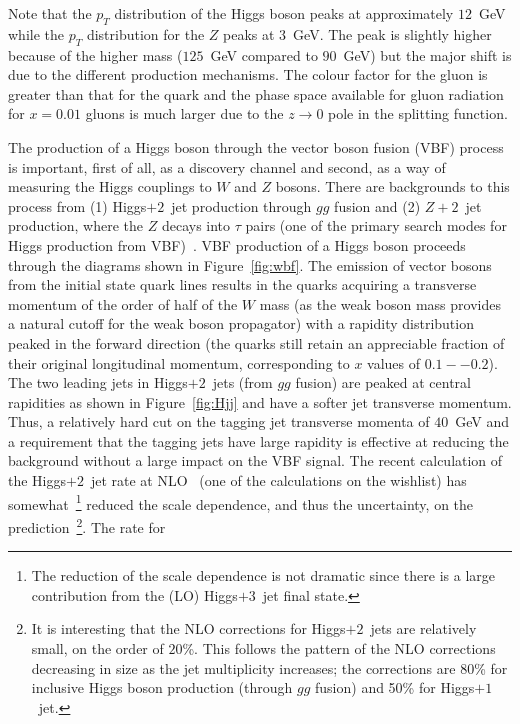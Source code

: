 \documentclass[12pt]{iopart}
\begin{document}
Note that the $p_T$ distribution of the Higgs boson peaks at approximately $12$~GeV while the $p_T$ distribution for the $Z$ peaks
at $3$~GeV. The peak is slightly higher because of the higher mass ($125$~GeV compared to $90$~GeV) but the major shift is
due to the different production mechanisms. The colour factor for the gluon is greater than that for the quark and the
phase space available for gluon radiation for $x=0.01$ gluons is much larger due to the $z \rightarrow 0$ pole in
the splitting function. 

The production of a Higgs boson through the vector boson fusion (VBF) process is important, first of all, as a discovery
channel and second, as a way of measuring the Higgs couplings to $W$ and $Z$ bosons. There are backgrounds to this process
from (1) Higgs$ + 2$~jet production through $gg$ fusion and (2) $Z + 2$~jet production, where the $Z$ decays into $\tau$
pairs (one of the primary  search modes for Higgs production from VBF)~\cite{Berger:2004pc}. VBF production of a Higgs
boson proceeds through the diagrams shown in Figure~\ref{fig:wbf}. The emission of vector bosons from the initial state
quark lines results in the quarks acquiring a transverse momentum of the order of half of the $W$ mass (as the weak boson
mass provides a natural cutoff for the weak boson propagator) with a rapidity distribution peaked in the forward direction
(the quarks still retain an appreciable fraction of their original longitudinal momentum, corresponding to $x$ values of
$0.1--0.2$). The two leading jets in Higgs$+ 2$~jets (from $gg$ fusion) %
are peaked at central rapidities as
shown in Figure~\ref{fig:Hjj} and have a softer jet transverse momentum.  Thus, a relatively hard cut on the tagging jet
transverse momenta of $40$~GeV and a requirement that the tagging jets have large rapidity is effective at reducing the
background without a large impact on the VBF signal. The recent calculation of the Higgs$ + 2$~jet rate
at NLO~\cite{Campbell:2006xx} (one of the calculations on the wishlist) has somewhat~\footnote{
The reduction of the scale dependence is not dramatic since there
is a large contribution from the (LO)  Higgs$+ 3$~jet final state.} reduced the scale dependence, and thus the uncertainty,
on the prediction~\footnote{It is interesting that the NLO corrections for Higgs$+ 2$~jets are relatively small, on the
order of $20$\%. This follows the pattern of the NLO corrections decreasing in size as the jet multiplicity increases; the
corrections are $80$\% for inclusive Higgs boson production (through $gg$ fusion) and 50\% for Higgs$ + 1$~jet.}. The rate for
\end{document}
